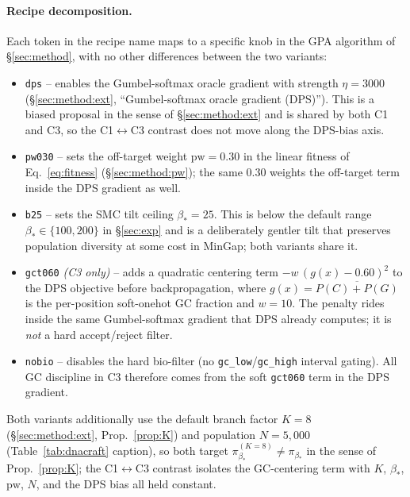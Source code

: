 \paragraph{Recipe decomposition.}
Each token in the recipe name maps to a specific knob in the GPA algorithm of \S\ref{sec:method}, with no other differences between the two variants:
\begin{itemize}
\item \texttt{dps} -- enables the Gumbel-softmax oracle gradient with strength $\eta\!=\!3000$ (\S\ref{sec:method:ext}, ``Gumbel-softmax oracle gradient (DPS)''). This is a biased proposal in the sense of \S\ref{sec:method:ext} and is shared by both C1 and C3, so the C1$\leftrightarrow$C3 contrast does not move along the DPS-bias axis.
\item \texttt{pw030} -- sets the off-target weight $\mathrm{pw}\!=\!0.30$ in the linear fitness of Eq.~\ref{eq:fitness} (\S\ref{sec:method:pw}); the same $0.30$ weights the off-target term inside the DPS gradient as well.
\item \texttt{b25} -- sets the SMC tilt ceiling $\beta_*\!=\!25$. This is below the default range $\beta_*\!\in\!\{100,200\}$ in \S\ref{sec:exp} and is a deliberately gentler tilt that preserves population diversity at some cost in MinGap; both variants share it.
\item \texttt{gct060} \emph{(C3 only)} -- adds a quadratic centering term $-w\,(g(x)-0.60)^2$ to the DPS objective before backpropagation, where $g(x)\!=\!\overline{P(C)+P(G)}$ is the per-position soft-onehot GC fraction and $w\!=\!10$. The penalty rides inside the same Gumbel-softmax gradient that DPS already computes; it is \emph{not} a hard accept/reject filter.
\item \texttt{nobio} -- disables the hard bio-filter (no \texttt{gc\_low}/\texttt{gc\_high} interval gating). All GC discipline in C3 therefore comes from the soft \texttt{gct060} term in the DPS gradient.
\end{itemize}
Both variants additionally use the default branch factor $K\!=\!8$ (\S\ref{sec:method:ext}, Prop.~\ref{prop:K}) and population $N\!=\!5{,}000$ (Table~\ref{tab:dnacraft} caption), so both target $\pi_{\beta_*}^{(K=8)}\!\neq\!\pi_{\beta_*}$ in the sense of Prop.~\ref{prop:K}; the C1$\leftrightarrow$C3 contrast isolates the GC-centering term with $K$, $\beta_*$, $\mathrm{pw}$, $N$, and the DPS bias all held constant.

